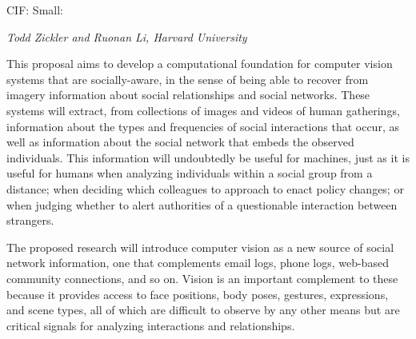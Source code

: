 \pagestyle{empty}

\noindent\textsf{CIF: Small:}\vspace{0.9ex}\\

\vspace{1.3ex}
\noindent \textsf{\large \em Todd Zickler and Ruonan Li, Harvard University}
\vspace{2.5ex}


\noindent This proposal aims to develop a computational foundation for computer vision systems that are socially-aware, in the sense of being able to recover from imagery information about social relationships and social networks. These systems will extract, from collections of images and videos of human gatherings, information about the types and frequencies of social interactions that occur, as well as information about the social network that embeds the observed individuals. This information will undoubtedly be useful for machines, just as it is useful for humans when analyzing individuals within a social group from a distance; when deciding which colleagues to approach to enact policy changes; or when judging whether to alert authorities of a questionable interaction between strangers.


The proposed research will introduce computer vision as a new source of social network information, one that complements email logs, phone logs, web-based community connections, and so on. Vision is an important complement to these because it provides access to face positions, body poses, gestures, expressions, and scene types, all of which are difficult to observe by any other means but are critical signals for analyzing interactions and relationships.


